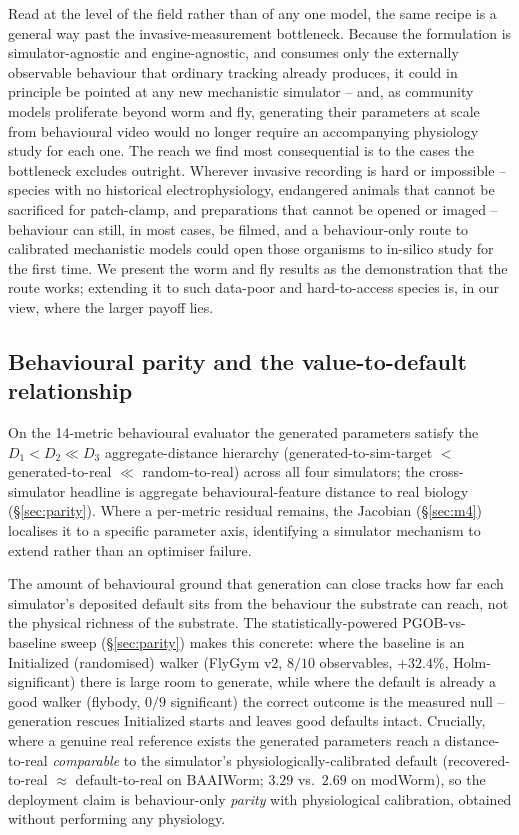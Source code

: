 \documentclass[11pt]{article}
\begin{document}
Read at the level of the field rather than of any one model, the same recipe is a general way past the invasive-measurement bottleneck. Because the formulation is simulator-agnostic and engine-agnostic, and consumes only the externally observable behaviour that ordinary tracking already produces, it could in principle be pointed at any new mechanistic simulator -- and, as community models proliferate beyond worm and fly, generating their parameters at scale from behavioural video would no longer require an accompanying physiology study for each one. The reach we find most consequential is to the cases the bottleneck excludes outright. Wherever invasive recording is hard or impossible -- species with no historical electrophysiology, endangered animals that cannot be sacrificed for patch-clamp, and preparations that cannot be opened or imaged -- behaviour can still, in most cases, be filmed, and a behaviour-only route to calibrated mechanistic models could open those organisms to in-silico study for the first time. We present the worm and fly results as the demonstration that the route works; extending it to such data-poor and hard-to-access species is, in our view, where the larger payoff lies.

\subsection{Behavioural parity and the value-to-default relationship}
\label{sec:sec_axis}

On the 14-metric behavioural evaluator the generated parameters satisfy the $D_1{<}D_2{\ll}D_3$ aggregate-distance hierarchy (generated-to-sim-target $<$ generated-to-real $\ll$ random-to-real) across all four simulators; the cross-simulator headline is aggregate behavioural-feature distance to real biology (\S\ref{sec:parity}). Where a per-metric residual remains, the Jacobian (\S\ref{sec:m4}) localises it to a specific parameter axis, identifying a simulator mechanism to extend rather than an optimiser failure.

The amount of behavioural ground that generation can close tracks how far each simulator's deposited default sits from the behaviour the substrate can reach, not the physical richness of the substrate. The statistically-powered PGOB-vs-baseline sweep (\S\ref{sec:parity}) makes this concrete: where the baseline is an Initialized (randomised) walker (FlyGym v2, $8/10$ observables, $+32.4\%$, Holm-significant) there is large room to generate, while where the default is already a good walker (flybody, $0/9$ significant) the correct outcome is the measured null -- generation rescues Initialized starts and leaves good defaults intact. Crucially, where a genuine real reference exists the generated parameters reach a distance-to-real \emph{comparable} to the simulator's physiologically-calibrated default (recovered-to-real $\approx$ default-to-real on BAAIWorm; $3.29$ vs.\ $2.69$ on modWorm), so the deployment claim is behaviour-only \emph{parity} with physiological calibration, obtained without performing any physiology.
\end{document}
